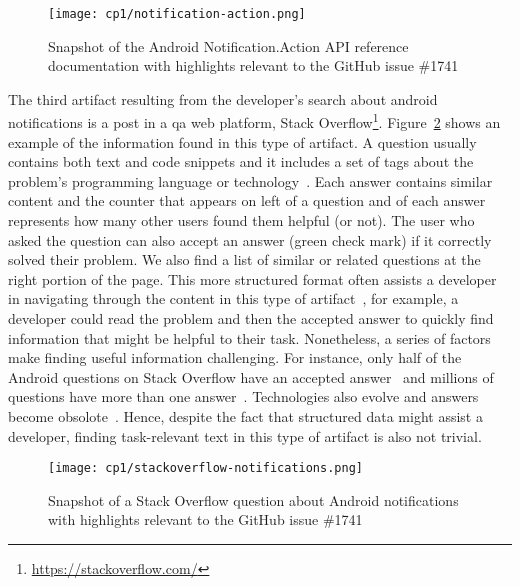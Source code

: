 \begin{figure}
    \centering
    \texttt{[image: cp1/notification-action.png]}
    \caption{Snapshot of the Android Notification.Action API reference documentation with highlights relevant to the GitHub issue \#1741}
    \label{fig:api-notification-action}
\end{figure}




The third artifact resulting from the developer's search 
about android notifications 
is a post in a \acf{qa} web platform, Stack Overflow\footnote{\url{https://stackoverflow.com/}}.
Figure~\ref{fig:qa-notification-icon} shows an example of the information found in this type of artifact.
A question usually contains both text and code snippets
and it includes a set of tags  about the
problem's programming language or technology~\cite{Treude2011a}. 
Each answer contains similar content and 
the counter that appears on left of a question and of each answer
represents how many other users found them helpful (or not).
The user who asked the question can also accept an answer (green check mark)
if it correctly solved their problem.
We also find a list of similar or related questions 
at the right portion of the page. 
This more structured format often assists a developer 
in navigating through the content in this type of artifact~\cite{nadi2020}, for example, a developer could read the problem and 
then the accepted answer to quickly find information that might be helpful 
to their task. Nonetheless, a series of factors make finding useful information challenging. 
For instance, only half of the Android questions on Stack Overflow
have an accepted answer~\cite{parnin2012} 
and millions of questions have more than one answer~\cite{nadi2020}.
Technologies also evolve and answers become obsolote~\cite{Allamanis2013}.
Hence, despite the fact that structured data  might 
assist a developer, finding task-relevant text in this type of artifact is also not 
trivial.




\begin{figure}
    \centering
    \texttt{[image: cp1/stackoverflow-notifications.png]}
    \caption{Snapshot of a Stack Overflow question about Android notifications  with highlights relevant to the GitHub issue \#1741}
    \label{fig:qa-notification-icon}
\end{figure}



